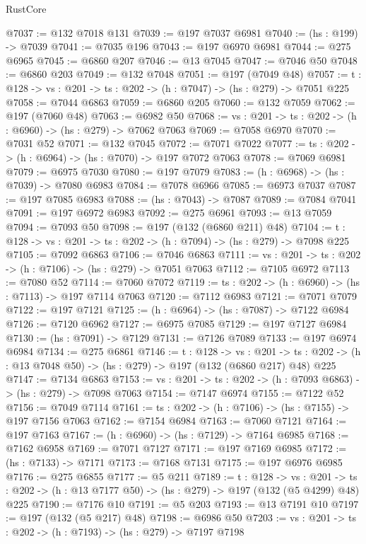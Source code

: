 \begin{lexlean}{RustCore}
\begin{coremodule}
@7037 := @132 @7018 @131
@7039 := @197 @7037 @6981
@7040 := (hs : @199) -> @7039
@7041 := @7035 @196
@7043 := @197 @6970 @6981
@7044 := @275 @6965
@7045 := @6860 @207
@7046 := @13 @7045
@7047 := @7046 @50
@7048 := @6860 @203
@7049 := @132 @7048
@7051 := @197 (@7049 @48)
@7057 := {t : @128} -> {vs : @201} -> {ts : @202} -> (h : @7047) -> (hs : @279) -> @7051 @225
@7058 := @7044 @6863
@7059 := @6860 @205
@7060 := @132 @7059
@7062 := @197 (@7060 @48)
@7063 := @6982 @50
@7068 := {vs : @201} -> {ts : @202} -> (h : @6960) -> (hs : @279) -> @7062 @7063
@7069 := @7058 @6970
@7070 := @7031 @52
@7071 := @132 @7045
@7072 := @7071 @7022
@7077 := {ts : @202} -> (h : @6964) -> (hs : @7070) -> @197 @7072 @7063
@7078 := @7069 @6981
@7079 := @6975 @7030
@7080 := @197 @7079
@7083 := (h : @6968) -> (hs : @7039) -> @7080 @6983
@7084 := @7078 @6966
@7085 := @6973 @7037
@7087 := @197 @7085 @6983
@7088 := (hs : @7043) -> @7087
@7089 := @7084 @7041
@7091 := @197 @6972 @6983
@7092 := @275 @6961
@7093 := @13 @7059
@7094 := @7093 @50
@7098 := @197 (@132 (@6860 @211) @48)
@7104 := {t : @128} -> {vs : @201} -> {ts : @202} -> (h : @7094) -> (hs : @279) -> @7098 @225
@7105 := @7092 @6863
@7106 := @7046 @6863
@7111 := {vs : @201} -> {ts : @202} -> (h : @7106) -> (hs : @279) -> @7051 @7063
@7112 := @7105 @6972
@7113 := @7080 @52
@7114 := @7060 @7072
@7119 := {ts : @202} -> (h : @6960) -> (hs : @7113) -> @197 @7114 @7063
@7120 := @7112 @6983
@7121 := @7071 @7079
@7122 := @197 @7121
@7125 := (h : @6964) -> (hs : @7087) -> @7122 @6984
@7126 := @7120 @6962
@7127 := @6975 @7085
@7129 := @197 @7127 @6984
@7130 := (hs : @7091) -> @7129
@7131 := @7126 @7089
@7133 := @197 @6974 @6984
@7134 := @275 @6861
@7146 := {t : @128} ->
  {vs : @201} ->
  {ts : @202} -> (h : @13 @7048 @50) -> (hs : @279) -> @197 (@132 (@6860 @217) @48) @225
@7147 := @7134 @6863
@7153 := {vs : @201} -> {ts : @202} -> (h : @7093 @6863) -> (hs : @279) -> @7098 @7063
@7154 := @7147 @6974
@7155 := @7122 @52
@7156 := @7049 @7114
@7161 := {ts : @202} -> (h : @7106) -> (hs : @7155) -> @197 @7156 @7063
@7162 := @7154 @6984
@7163 := @7060 @7121
@7164 := @197 @7163
@7167 := (h : @6960) -> (hs : @7129) -> @7164 @6985
@7168 := @7162 @6958
@7169 := @7071 @7127
@7171 := @197 @7169 @6985
@7172 := (hs : @7133) -> @7171
@7173 := @7168 @7131
@7175 := @197 @6976 @6985
@7176 := @275 @6855
@7177 := @5 @211
@7189 := {t : @128} ->
  {vs : @201} ->
  {ts : @202} -> (h : @13 @7177 @50) -> (hs : @279) -> @197 (@132 (@5 @4299) @48) @225
@7190 := @7176 @10
@7191 := @5 @203
@7193 := @13 @7191 @10
@7197 := @197 (@132 (@5 @217) @48)
@7198 := @6986 @50
@7203 := {vs : @201} -> {ts : @202} -> (h : @7193) -> (hs : @279) -> @7197 @7198

\end{coremodule}
\end{lexlean}
